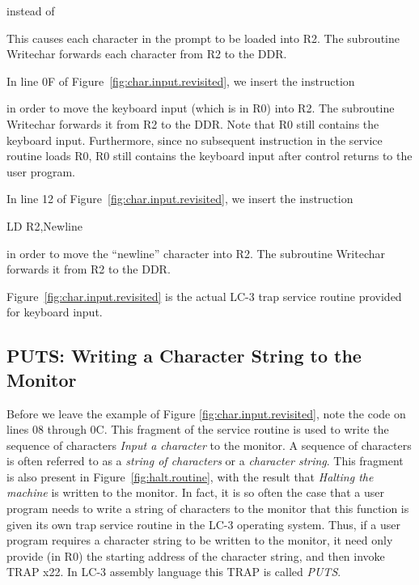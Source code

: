\documentclass{patt}
\begin{document}
instead of
This causes each character in the prompt to be loaded into R2.  The
subroutine Writechar forwards each character from R2 to the DDR.

In line 0F of Figure~\ref{fig:char.input.revisited}, we insert the
instruction

in order to move the keyboard input (which is in R0) into R2.  The
subroutine Writechar forwards it from R2 to the DDR.  Note that R0
still contains the keyboard input.  Furthermore, since no subsequent
instruction in the service routine loads R0, R0 still contains the
keyboard input after control returns to the user program.

In line 12 of Figure~\ref{fig:char.input.revisited}, we insert the
instruction

\begin{colorverbatim}
                         LD     R2,Newline
\end{colorverbatim}
in order to move the ``newline'' character into R2.  The subroutine
Writechar forwards it from R2 to the DDR.

Figure~\ref{fig:char.input.revisited} is the actual LC-3 trap service
routine provided for keyboard input.

\FloatBarrier
\subsection{PUTS: Writing a Character String to the Monitor}

Before we leave the example of Figure \ref{fig:char.input.revisited},
note the code on lines 08 through 0C. This fragment of the service
routine is used to write the sequence of characters {\em Input a
character} to the monitor.  A sequence of characters is often
 referred to as a {\em string of characters} or a {\em
character string}.  This fragment is also present in
Figure~\ref{fig:halt.routine}, with the result that {\em Halting the
machine} is written to the monitor.  In fact, it is so often the case
that a user program needs to write a string of characters to the
monitor that this function is given its own trap service routine in the
\hbox{LC-3} operating system.  Thus, if a user program requires a
character string to be written to the monitor, it need only provide
(in R0) the starting address of the character string, and then invoke
TRAP x22.  In LC-3 assembly language this TRAP is called {\em PUTS}.
\end{document}
